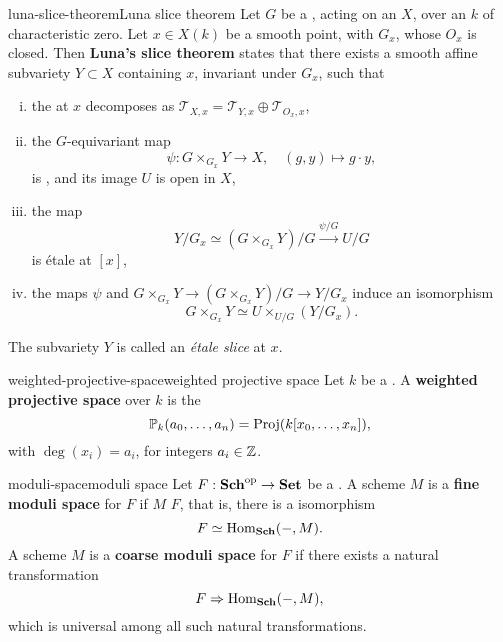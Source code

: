 \begin{topic}{luna-slice-theorem}{Luna slice theorem}
    Let $G$ be a  , acting on an  $X$, over an  $k$ of characteristic zero. Let $x \in X(k)$ be a smooth point, with  $G_x$, whose  $O_x$ is closed. Then \textbf{Luna's slice theorem} states that there exists a smooth affine subvariety $Y \subset X$ containing $x$, invariant under $G_x$, such that
    \begin{enumerate}[(i)]
        \item the  at $x$ decomposes as $\mathcal{T}_{X, x} = \mathcal{T}_{Y, x} \oplus \mathcal{T}_{O_x, x}$,
        \item the $G$-equivariant map
        \[ \psi : G \times_{G_x} Y \to X, \quad (g, y) \mapsto g \cdot y , \]
        is , and its image $U$ is open in $X$,
        \item the map
        \[ Y/G_x \simeq (G \times_{G_x} Y) / G \xrightarrow{\psi / G} U / G \]
        is étale at $[x]$,
        \item the maps $\psi$ and $G \times_{G_x} Y \to (G \times_{G_x} Y) / G \to Y / G_x$ induce an isomorphism
        \[ G \times_{G_x} Y \simeq U \times_{U/G} (Y/G_x) . \]
    \end{enumerate}
    The subvariety $Y$ is called an \textit{étale slice} at $x$.
\end{topic}

\begin{topic}{weighted-projective-space}{weighted projective space}
    Let $k$ be a . A \textbf{weighted projective space} over $k$ is the 
    \[ \mathbb{P}_k(a_0, \ldots, a_n) = \textup{Proj}(k[x_0, \ldots, x_n]) , \]
    with $\deg(x_i) = a_i$, for integers $a_i \in \mathbb{Z}$.
\end{topic}

\begin{topic}{moduli-space}{moduli space}
    Let $F : \textbf{Sch}^\textup{op} \to \textbf{Set}$ be a .
    A scheme $M$ is a \textbf{fine moduli space} for $F$ if $M$  $F$, that is, there is a  isomorphism
    \[ F \simeq \text{Hom}_\textbf{Sch}(-, M) . \]
    A scheme $M$ is a \textbf{coarse moduli space} for $F$ if there exists a natural transformation
    \[ F \Rightarrow \text{Hom}_\textbf{Sch}(-, M) , \]
    which is universal among all such natural transformations.
\end{topic}

